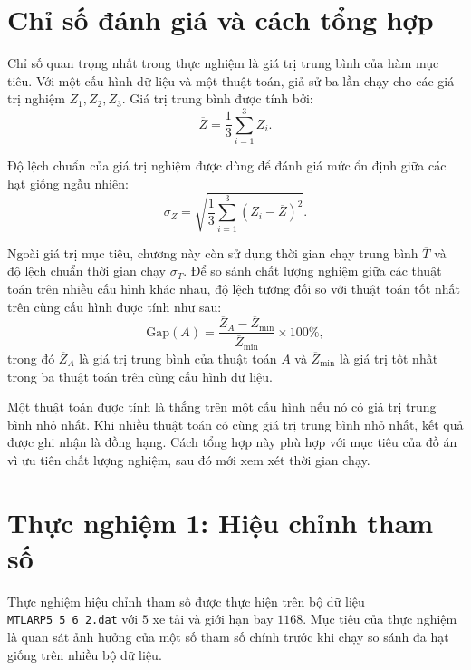 \section{Chỉ số đánh giá và cách tổng hợp}

Chỉ số quan trọng nhất trong thực nghiệm là giá trị trung bình của hàm mục tiêu. Với một cấu hình dữ liệu và một thuật toán, giả sử ba lần chạy cho các giá trị nghiệm $Z_1,Z_2,Z_3$. Giá trị trung bình được tính bởi:
\begin{equation}
    \overline{Z} = \frac{1}{3}\sum_{i=1}^{3} Z_i.
    \label{eq:chapter5-mean-objective}
\end{equation}

Độ lệch chuẩn của giá trị nghiệm được dùng để đánh giá mức ổn định giữa các hạt giống ngẫu nhiên:
\begin{equation}
    \sigma_Z = \sqrt{\frac{1}{3}\sum_{i=1}^{3}(Z_i-\overline{Z})^2}.
    \label{eq:chapter5-std-objective}
\end{equation}

Ngoài giá trị mục tiêu, chương này còn sử dụng thời gian chạy trung bình $\overline{T}$ và độ lệch chuẩn thời gian chạy $\sigma_T$. Để so sánh chất lượng nghiệm giữa các thuật toán trên nhiều cấu hình khác nhau, độ lệch tương đối so với thuật toán tốt nhất trên cùng cấu hình được tính như sau:
\begin{equation}
    \mathrm{Gap}(A) = \frac{\overline{Z}_A - \overline{Z}_{\min}}{\overline{Z}_{\min}} \times 100\%,
    \label{eq:chapter5-gap}
\end{equation}
trong đó $\overline{Z}_A$ là giá trị trung bình của thuật toán $A$ và $\overline{Z}_{\min}$ là giá trị tốt nhất trong ba thuật toán trên cùng cấu hình dữ liệu.

Một thuật toán được tính là thắng trên một cấu hình nếu nó có giá trị trung bình nhỏ nhất. Khi nhiều thuật toán có cùng giá trị trung bình nhỏ nhất, kết quả được ghi nhận là đồng hạng. Cách tổng hợp này phù hợp với mục tiêu của đồ án vì ưu tiên chất lượng nghiệm, sau đó mới xem xét thời gian chạy.

\section{Thực nghiệm 1: Hiệu chỉnh tham số}

Thực nghiệm hiệu chỉnh tham số được thực hiện trên bộ dữ liệu \texttt{MTLARP5\_5\_6\_2.dat} với $5$ xe tải và giới hạn bay $1168$. Mục tiêu của thực nghiệm là quan sát ảnh hưởng của một số tham số chính trước khi chạy so sánh đa hạt giống trên nhiều bộ dữ liệu.

